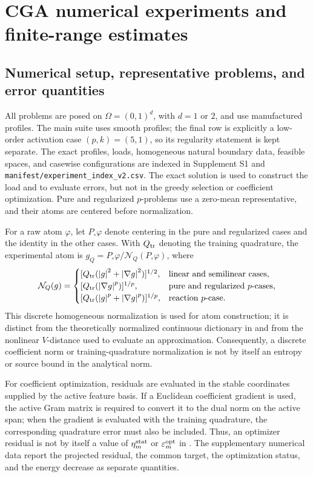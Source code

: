\section{CGA numerical experiments and finite-range estimates}
\label{sec:numerics}

\subsection{Numerical setup, representative problems, and error quantities}

All problems are posed on \(\Omega=(0,1)^d\), with \(d=1\) or \(2\), and use manufactured
profiles. The main suite uses smooth profiles; the final row is explicitly a low-order activation
case \((p,k)=(5,1)\), so its regularity statement is kept separate. The exact profiles, loads, homogeneous natural boundary data, feasible spaces, and
casewise configurations are indexed in Supplement S1 and \texttt{manifest/experiment\_index\_v2.csv}. The exact solution is
used to construct the load and to evaluate errors, but not in the greedy selection or coefficient
optimization. Pure and regularized \(p\)-problems use a zero-mean representative, and their atoms are
centered before normalization.

For a raw atom \(\varphi\), let \(P_\circ\varphi\) denote centering in the pure and regularized cases and
the identity in the other cases. With \(Q_{\rm tr}\) denoting the training quadrature, the experimental
atom is \(g_Q=P_\circ\varphi/\mathcal N_Q(P_\circ\varphi)\), where
\[
 \mathcal N_Q(g)=
 \begin{cases}
 [Q_{\rm tr}(\abs g^2+\abs{\nabla g}^2)]^{1/2},&\text{linear and semilinear cases},\\
 [Q_{\rm tr}(\abs{\nabla g}^p)]^{1/p},&\text{pure and regularized \(p\)-cases},\\
 [Q_{\rm tr}(\abs g^p+\abs{\nabla g}^p)]^{1/p},&\text{reaction \(p\)-case}.
 \end{cases}
\]
This discrete homogeneous normalization is used for atom construction; it is distinct from the
theoretically normalized continuous dictionary in  and from the nonlinear
\(V\)-distance used to evaluate an approximation. Consequently, a discrete coefficient norm or
training-quadrature normalization is not by itself an entropy or source bound in the analytical norm.

For coefficient optimization, residuals are evaluated in the stable coordinates supplied
by the active feature basis. If a Euclidean coefficient gradient is used, the active
Gram matrix is required to convert it to the dual norm on the active span; when the
gradient is evaluated with the training quadrature, the corresponding quadrature error
must also be included. Thus, an optimizer residual is not by itself a value of
$\eta_m^{\rm stat}$ or $\varepsilon_m^{\rm opt}$ in . The
supplementary numerical data report the projected residual, the common target, the
optimization status, and the energy decrease as separate quantities.

